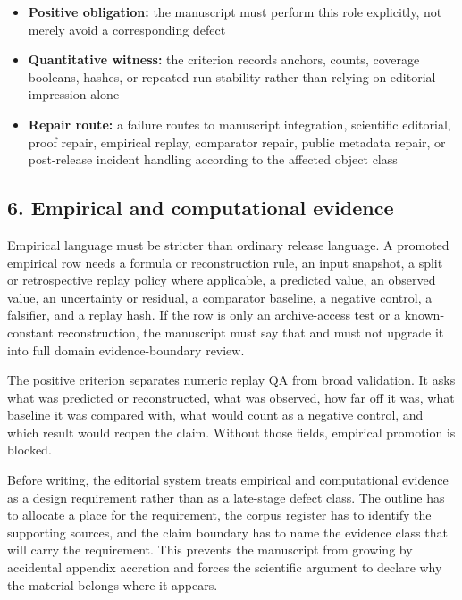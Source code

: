 \begin{itemize}[leftmargin=1.8em]

\item \textbf{Positive obligation:} the manuscript must perform this role explicitly, not merely avoid a corresponding defect

\item \textbf{Quantitative witness:} the criterion records anchors, counts, coverage booleans, hashes, or repeated-run stability rather than relying on editorial impression alone

\item \textbf{Repair route:} a failure routes to manuscript integration, scientific editorial, proof repair, empirical replay, comparator repair, public metadata repair, or post-release incident handling according to the affected object class

\end{itemize}

\subsection{6. Empirical and computational evidence}

Empirical language must be stricter than ordinary release language. A promoted empirical row needs a formula or reconstruction rule, an input snapshot, a split or retrospective replay policy where applicable, a predicted value, an observed value, an uncertainty or residual, a comparator baseline, a negative control, a falsifier, and a replay hash. If the row is only an archive-access test or a known-constant reconstruction, the manuscript must say that and must not upgrade it into full domain evidence-boundary review.


The positive criterion separates numeric replay QA from broad validation. It asks what was predicted or reconstructed, what was observed, how far off it was, what baseline it was compared with, what would count as a negative control, and which result would reopen the claim. Without those fields, empirical promotion is blocked.


Before writing, the editorial system treats empirical and computational evidence as a design requirement rather than as a late-stage defect class. The outline has to allocate a place for the requirement, the corpus register has to identify the supporting sources, and the claim boundary has to name the evidence class that will carry the requirement. This prevents the manuscript from growing by accidental appendix accretion and forces the scientific argument to declare why the material belongs where it appears.


